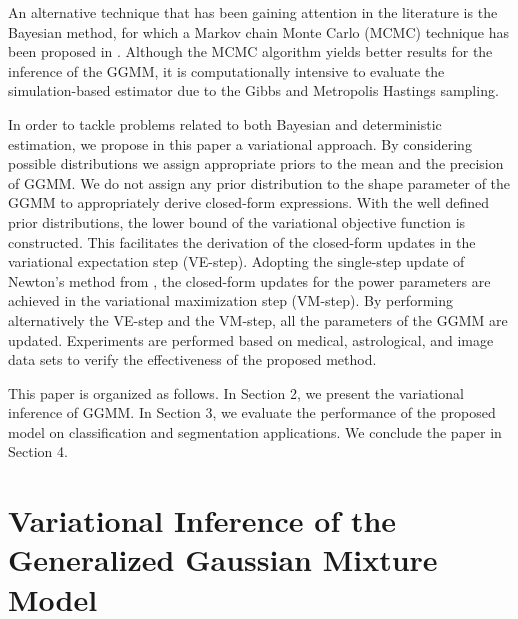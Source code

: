 \documentclass[conference]{IEEEtran}
\begin{document}
An alternative technique that has been gaining attention in the literature is the Bayesian method, for which a Markov chain Monte Carlo (MCMC) technique has been proposed in \cite{nb1}. Although the MCMC algorithm yields better results for the inference of the GGMM, it is computationally intensive to evaluate the simulation-based estimator due to the Gibbs and Metropolis Hastings sampling.

In order to tackle problems related to both Bayesian and deterministic estimation, we propose in this paper a variational approach. 
By considering possible distributions we assign appropriate priors to the mean and the precision of GGMM. We do not assign any prior distribution to the shape parameter of the GGMM to appropriately derive closed-form expressions. 
With the well defined prior distributions, the lower bound of the variational objective function is constructed. This facilitates the derivation of the closed-form updates in the variational expectation step (VE-step).
Adopting the single-step update of Newton's method from \cite{g2}, the closed-form updates for the power parameters are achieved in the variational maximization step (VM-step).
By performing alternatively the VE-step and the VM-step, all the parameters of the GGMM are updated.
Experiments are performed based on medical, astrological, and image data sets to verify the effectiveness of the proposed method.

This paper is organized as follows. In Section 2, we present the variational inference of GGMM. 
In Section 3, we
evaluate the performance of the proposed model on classification and segmentation applications.
We conclude the paper in Section 4.

\section{Variational Inference of the Generalized Gaussian Mixture Model}
\end{document}
